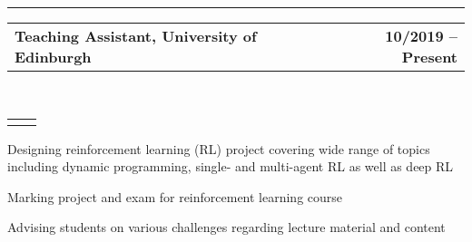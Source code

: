 \documentclass[]{lukas-cv}
\makeatletter
\newcommand{\headerrow}[2]
{\begin{tabular*}{\linewidth}{l@{\extracolsep{\fill}}r}
	\fontspec{Helvetica}\fontsize{12pt}{12pt}\selectfont\bfseries{\color{subheadings}#1} &
	\fontspec{Helvetica}\fontsize{12pt}{12pt}\selectfont\bfseries{\color{subheadings}#2} \\
\end{tabular*}}
\newcommand{\locationrow}[2]
{\begin{tabular*}{\linewidth}{l@{\extracolsep{\fill}}r}
        \color{headings}\scshape\fontspec{Heiti TC Medium}\fontsize{10pt}{12pt}\selectfont{#1}  &
        \color{headings}\scshape\fontspec{Heiti TC Medium}\fontsize{10pt}{12pt}\selectfont{#2}  \\
\end{tabular*}}
\makeatother
\begin{document}


\hrule
\vspace{0.4em}

\noindent
\headerrow{Teaching Assistant, University of Edinburgh}{10/2019 -- Present}
\\
\locationrow{Reinforcement Learning, School of Informatics}{}
\begin{tightitemize}{1.7em}
    \item Designing reinforcement learning (RL) project covering wide range of topics including dynamic programming, single- and multi-agent RL as well as deep RL
    \item Marking project and exam for reinforcement learning course
    \item Advising students on various challenges regarding lecture material and content
\end{tightitemize}
\largesectionsep

\end{document}
